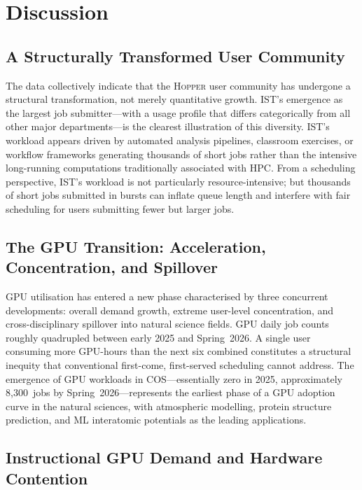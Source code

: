 \documentclass[11pt,letterpaper]{article}
\newcommand{\hopper}{\textsc{Hopper}}
\begin{document}
\section{Discussion}
\label{sec:discussion}

\subsection{A Structurally Transformed User Community}

The data collectively indicate that the \hopper{} user community has undergone a
structural transformation, not merely quantitative growth.  IST's emergence as
the largest job submitter---with a usage profile that differs categorically from
all other major departments---is the clearest illustration of this diversity.
IST's workload appears driven by automated analysis pipelines, classroom
exercises, or workflow frameworks generating thousands of short jobs rather than
the intensive long-running computations traditionally associated with HPC.  From
a scheduling perspective, IST's workload is not particularly resource-intensive;
but thousands of short jobs submitted in bursts can inflate queue length and
interfere with fair scheduling for users submitting fewer but larger jobs.

\subsection{The GPU Transition: Acceleration, Concentration, and Spillover}

GPU utilisation has entered a new phase characterised by three concurrent
developments: overall demand growth, extreme user-level concentration, and
cross-disciplinary spillover into natural science fields.  GPU daily job counts
roughly quadrupled between early 2025 and Spring~2026.  A single user consuming
more GPU-hours than the next six combined constitutes a structural inequity that
conventional first-come, first-served scheduling cannot address.  The emergence
of GPU workloads in COS---essentially zero in 2025, approximately 8,300~jobs by
Spring~2026---represents the earliest phase of a GPU adoption curve in the natural
sciences, with atmospheric modelling, protein structure prediction, and ML
interatomic potentials as the leading applications.

\subsection{Instructional GPU Demand and Hardware Contention}
\end{document}
